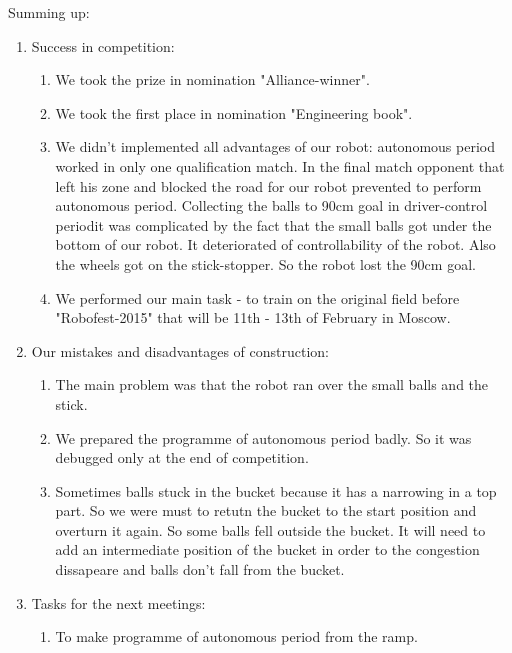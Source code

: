 Summing up:
\begin{enumerate}
  \item Success in competition:
  \begin{enumerate}
	\item We took the prize in nomination "Alliance-winner".
	
	\item We took the first place in nomination "Engineering book".
	
	\item We didn't implemented all advantages of our robot: autonomous period worked in only one qualification match. In the final match opponent that left his zone and blocked the road for our robot prevented to perform autonomous period. Collecting the balls to 90cm goal in driver-control periodit was complicated by the fact that the small balls got under the bottom of our robot. It deteriorated of controllability of the robot. Also the wheels got on the stick-stopper. So the robot lost the 90cm goal.
	
	\item We performed our main task - to train on the original field before "Robofest-2015" that will be 11th - 13th of February in Moscow.
	
  \end{enumerate}
  
  \item Our mistakes and disadvantages of construction:
  \begin{enumerate}
  	\item The main problem was that the robot ran over the small balls and the stick.
  	
  	\item We prepared the programme of autonomous period badly. So it was debugged only at the end of competition.
  	
  	\item Sometimes balls stuck in the bucket because it has a narrowing in a top part. So we were must to retutn the bucket to the start position and overturn it again. So some balls fell outside the bucket. It will need to add an intermediate position of the bucket in order to the congestion dissapeare and balls don't fall from the bucket.
  	
  \end{enumerate}
  
  \item Tasks for the next meetings:
  \begin{enumerate}
  	\item To make programme of autonomous period from the ramp.
  	

\end{enumerate}
\end{enumerate}
